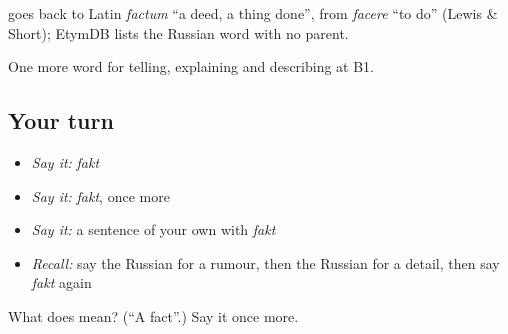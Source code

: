 \begin{cousinweb}
\emph{} goes back to Latin \emph{factum} \textquotedblleft{}a deed, a thing done\textquotedblright{}, from \emph{facere} \textquotedblleft{}to do\textquotedblright{} (Lewis \& Short); EtymDB lists the Russian word with no parent.
\end{cousinweb}

\begin{grammarlens}[title={What you've built}]
One more word for telling, explaining and describing at B1.
\end{grammarlens}

\subsection*{Your turn}
\begin{itemize}
\raggedright
  \item \emph{Say it:} \emph{fakt}
  \item \emph{Say it:} \emph{fakt}, once more
  \item \emph{Say it:} a sentence of your own with \emph{fakt}
  \item \emph{Recall:} say the Russian for a rumour, then the Russian for a detail, then say \emph{fakt} again
\end{itemize}

\begin{tcolorbox}[breakable,colback=teal!4,colframe=teal!35!black,title={Before you move on}]
What does  mean? (\textquotedblleft{}A fact\textquotedblright{}.) Say it once more.
\end{tcolorbox}
